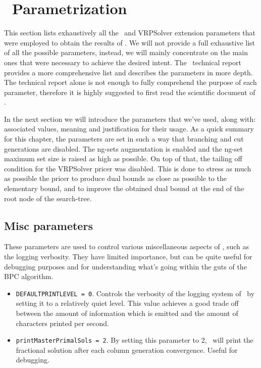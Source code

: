 \chapter{\bapcod\ Parametrization}
\label{sec:bapcod-appendix}

This section lists exhaustively all the \bapcod\ and VRPSolver extension
parameters that were employed  to obtain the results of .
We will not provide a full exhaustive list of all the possible parameters,
instead, we will mainly concentrate on the main ones that were necessary to achieve
the desired intent.
The \bapcod\ technical report \textcite{sadykov2021} provides a more
comprehensive list and describes the parameters in more depth.
The technical report alone is not enough to fully comprehend the purpose of each parameter,
therefore it is highly suggested to first read the scientific document of \textcite{pessoa2020a}.

\medskip

In the next section we will introduce the parameters that we've used, along
with: associated values, meaning and justification for their usage.
As a quick summary for this chapter, the parameters are set in such a way
that branching and cut generations are disabled.
The ng-sets augmentation is enabled and the ng-set maximum
set size is raised as high as possible.
On top of that, the tailing off condition for the VRPSolver pricer was disabled.
This is done to stress as much as possible the pricer to produce
dual bounds as close as possible to the elementary bound, and to
improve the obtained dual bound at the end of the root node of the search-tree.

\section{Misc parameters}
These parameters are used to control various miscellaneous aspects of \bapcod,
such as the logging verbosity.
They have limited importance, but can be quite useful for debugging purposes
and for understanding what's going within the guts of the BPC algorithm.

\begin{itemize}
	\item \texttt{DEFAULTPRINTLEVEL = 0}.
	      Controls the verbosity of the logging system of \bapcod\ by setting it to a relatively quiet level.
	      This value achieves a good trade off between the amount of information which is emitted
	      and the amount of characters printed per second.
	\item \texttt{printMasterPrimalSols = 2}.
	      By setting this parameter to 2, \bapcod\ will print the fractional solution after each column generation convergence.
	      Useful for debugging.
\end{itemize}

